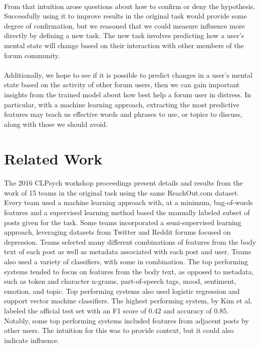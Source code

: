 \documentclass{article}
\begin{document}
\paragraph{}From that intuition arose questions about how to confirm or deny the hypothesis. Successfully using it to improve results in the original task would provide some degree of confirmation, but we reasoned that we could measure influence more directly by defining a new task. The new task involves predicting how a user's mental state will change based on their interaction with other members of the forum community.

\paragraph{}Additionally, we hope to see if it is possible to predict changes in a user's mental state based on the activity of other forum users, then we can gain important insights from the trained model about how best help a forum user in distress. In particular, with a machine learning approach, extracting the most predictive features may teach us effective words and phrases to use, or topics to discuss, along with those we should avoid.

\section{Related Work}

\paragraph{}The 2016 CLPsych workshop proceedings present details and results from the work of 15 teams in the original task using the same ReachOut.com dataset. Every team used a machine learning approach with, at a minimum, bag-of-words features and a supervised learning method based the manually labeled subset of posts given for the task. Some teams incorporated a semi-supervised learning approach, leveraging datasets from Twitter and Reddit forums focused on depression. Teams selected many different combinations of features from the body text of each post as well as metadata associated with each post and user. Teams also used a variety of classifiers, with some in combination\cite{milne}. The top performing systems tended to focus on features from the body text, as opposed to metadata, such as token and character n-grams, part-of-speech tags, mood, sentiment, emotion, and topic. Top performing systems also used logistic regression and support vector machine classifiers. The highest performing system, by Kim et al, labeled the official test set with an F1 score of 0.42 and accuracy of 0.85\cite{kim}. Notably, some top performing systems included features from adjacent posts by other users. The intuition for this was to provide context, but it could also indicate influence.
\end{document}
